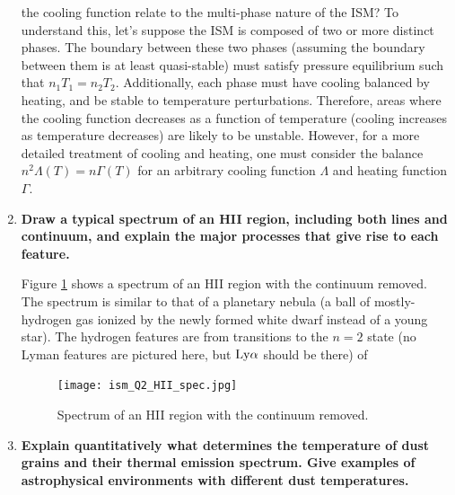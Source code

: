 \begin{enumerate}
       the cooling function relate to the multi-phase nature of the ISM?
      To understand this, let's suppose the ISM is composed of two or more distinct phases.
      The boundary between these two phases (assuming the boundary between them is at least
      quasi-stable) must satisfy pressure equilibrium such that $n_1T_1=n_2T_2$.  Additionally,
      each phase must have cooling balanced by heating, and be stable to temperature
      perturbations.
      Therefore, areas where the cooling function decreases as a function of temperature
      (cooling increases as temperature decreases) are likely to be unstable.  However, for a more
      detailed treatment of cooling and heating, one must consider the balance $n^2\Lambda(T) = n\Gamma(T)$
      for an arbitrary cooling function $\Lambda$ and heating function $\Gamma$.
      
\item \textbf{Draw a typical spectrum of an HII region, including both lines and continuum, and
      explain the major processes that give rise to each feature.}
      
      Figure \ref{f:HIIspec} shows a spectrum of an HII region with the continuum removed. The spectrum is similar to that of a planetary nebula (a ball of mostly-hydrogen gas ionized by the newly formed white dwarf instead of a young star). The hydrogen features are from transitions to the $n=2$ state (no Lyman features are pictured here, but ${\rm Ly}\alpha$ should be there) of 
      
      \begin{figure}[ht]
      \begin{center}
      \texttt{[image: ism\_Q2\_HII\_spec.jpg]}
      \end{center}
      \caption{Spectrum of an HII region with the continuum removed. \label{f:HIIspec}}
	\end{figure}
\item \textbf{Explain quantitatively what determines the temperature of dust grains and their
      thermal emission spectrum. Give examples of astrophysical environments with different
      dust temperatures.}
\end{enumerate}

